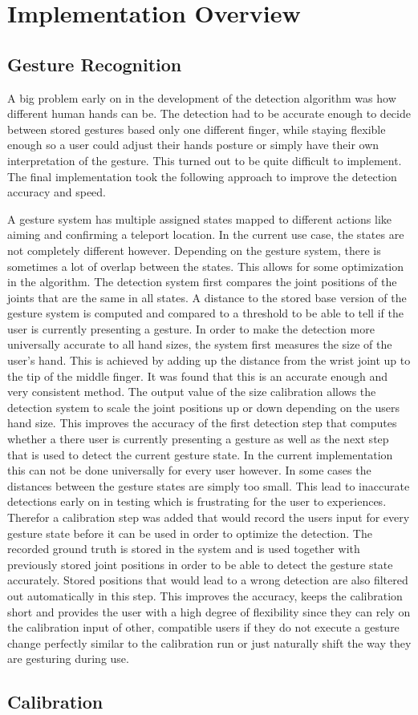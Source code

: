 \chapter{Implementation Overview}
\label{cha:ImplementationOverview}

\section{Gesture Recognition}
A big problem early on in the development of the detection algorithm was how different human hands can be. The detection had to be accurate enough to decide between stored gestures based only one different finger, while staying flexible enough so a user could adjust their hands posture or simply have their own interpretation of the gesture. This turned out to be quite difficult to implement. The final implementation took the following approach to improve the detection accuracy and speed.

A gesture system has multiple assigned states mapped to different actions like aiming and confirming a teleport location. In the current use case, the states are not completely different however. Depending on the gesture system, there is sometimes a lot of overlap between the states. This allows for some optimization in the algorithm. The detection system first compares the joint positions of the joints that are the same in all states. A distance to the stored base version of the gesture system is computed and compared to a threshold to be able to tell if the user is currently presenting a gesture. In order to make the detection more universally accurate to all hand sizes, the system first measures the size of the user's hand. This is achieved by adding up the distance from the wrist joint up to the tip of the middle finger. It was found that this is an accurate enough and very consistent method. The output value of the size calibration allows the detection system to scale the joint positions up or down depending on the users hand size. This improves the accuracy of the first detection step that computes whether a there user is currently presenting a gesture as well as the next step that is used to detect the current gesture state. In the current implementation this can not be done universally for every user however. In some cases the distances between the gesture states are simply too small. This lead to inaccurate detections early on in testing which is frustrating for the user to experiences. Therefor a calibration step was added that would record the users input for every gesture state before it can be used in order to optimize the detection. The recorded ground truth is stored in the system and is used together with previously stored joint positions in order to be able to detect the gesture state accurately. Stored positions that would lead to a wrong detection are also filtered out automatically in this step. This improves the accuracy, keeps the calibration short and provides the user with a high degree of flexibility since they can rely on the calibration input of other, compatible users if they do not execute a gesture change perfectly similar to the calibration run or just naturally shift the way they are gesturing during use.

\section{Calibration}
